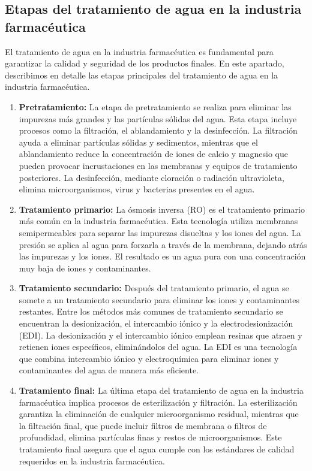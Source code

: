 \subsection{Etapas del tratamiento de agua en la industria farmacéutica}

El tratamiento de agua en la industria farmacéutica es fundamental para garantizar la calidad y seguridad de los productos finales. En este apartado, describimos en detalle las etapas principales del tratamiento de agua en la industria farmacéutica.

\begin{enumerate}
    \item \textbf{Pretratamiento:}  La etapa de pretratamiento se realiza para eliminar las impurezas más grandes y las partículas sólidas del agua.
          Esta etapa incluye procesos como la filtración, el ablandamiento y la desinfección. La filtración ayuda a eliminar partículas sólidas y
          sedimentos, mientras que el ablandamiento reduce la concentración de iones de calcio y magnesio que pueden provocar incrustaciones en las
          membranas y equipos de tratamiento posteriores. La desinfección, mediante cloración o radiación ultravioleta, elimina microorganismos,
          virus y bacterias presentes en el agua.

    \item \textbf{Tratamiento primario:}  La ósmosis inversa (RO) es el tratamiento primario más común en la industria farmacéutica. Esta tecnología
          utiliza membranas semipermeables para separar las impurezas disueltas y los iones del agua. La presión se aplica al agua para forzarla
          a través de la membrana, dejando atrás las impurezas y los iones. El resultado es un agua pura con una concentración muy baja de
          iones y contaminantes.

    \item \textbf{Tratamiento secundario:} Después del tratamiento primario, el agua se somete a un tratamiento secundario para eliminar los
          iones y contaminantes restantes. Entre los métodos más comunes de tratamiento secundario se encuentran la desionización, el
          intercambio iónico y la electrodesionización (EDI). La desionización y el intercambio iónico emplean resinas que atraen y
          retienen iones específicos, eliminándolos del agua. La EDI es una tecnología que combina intercambio iónico y electroquímica
          para eliminar iones y contaminantes del agua de manera más eficiente.

    \item \textbf{Tratamiento final:} La última etapa del tratamiento de agua en la industria farmacéutica implica procesos de esterilización y filtración.
          La esterilización garantiza la eliminación de cualquier microorganismo residual, mientras que la filtración final, que puede incluir
          filtros de membrana o filtros de profundidad, elimina partículas finas y restos de microorganismos. Este tratamiento final asegura que
          el agua cumple con los estándares de calidad requeridos en la industria farmacéutica.

\end{enumerate}




